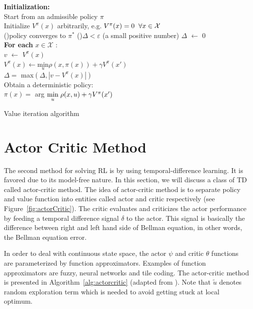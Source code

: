 \begin{algorithm}
	\textbf{Initialization:} \\
	Start from an admissible policy $ \pi $\\
	Initialize $V^{\pi}(x)$ arbitrarily, e.g. $ V^{\pi}(x) = 0 \hspace{2mm}  \forall x \in \mathcal{X} $ \\
	\Repeat(){policy converges to $ \pi^* $}{
		\Repeat(){$ \Delta  <  \varepsilon $ (a small positive number)}{
			$ \Delta $ $ \leftarrow $ 0 \\
			\textbf{For each} $ x \in \mathcal{X} $ :\\
			\hspace{5mm} $ v $ $ \leftarrow $ $ V^{\pi}(x) $ \\
			\hspace{5mm} $ V^{\pi}(x) \leftarrow \underset{u}{\text{min}} \rho(x, \pi(x)) + \gamma V^{\pi}(x') $ \\
			\hspace{5mm} $ \Delta = $ max$ (\Delta, |v-V^{\pi}(x)|) $ \\}
		\vspace{2mm}
		Obtain a deterministic policy: \\
		$ \pi(x)=$  arg $\underset{u}{\text{min}} \hspace{1mm} \rho(x, u) +\gamma V^{\pi}(x') $  \\

	}
	\caption{Value iteration algorithm}
\label{alg:VI}
\end{algorithm}

 
\section{Actor Critic Method} \label{sec:actor}
The second method for solving \ac{RL} is by using temporal-difference learning. It is favored due to its model-free nature. In this section, we will discuss a class of \ac{TD} called actor-critic method. The idea of actor-critic method is to separate policy and value function into entities called actor and critic respectively (see Figure~\ref{fig:actorCritic}). The critic evaluates and criticizes the actor performance by feeding a temporal difference signal $\delta$ to the actor. This signal is basically the difference between right and left hand side of Bellman equation, in other words, the Bellman equation error. 

In order to deal with continuous state space, the actor $\psi$ and critic $\theta$ functions are parameterized by function approximators. Examples of function approximators are fuzzy, neural networks and tile coding. The actor-critic method is presented in Algorithm~\ref{alg:actorcritic} (adapted from \cite{babuskaRL}). Note that $\tilde{u}$ denotes random exploration term which is needed to avoid getting stuck at local optimum.

